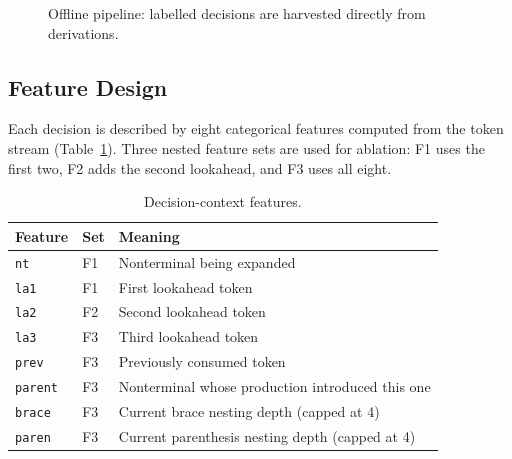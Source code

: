 \documentclass[12pt,a4paper]{article}
\begin{document}
\begin{figure}[H]
\centering
{}
\caption{Offline pipeline: labelled decisions are harvested directly from derivations.}
\label{fig:train}
\end{figure}

\subsection{Feature Design}

Each decision is described by eight categorical features computed from the
token stream (Table~\ref{tab:features}). Three nested feature sets are used for
ablation: F1 uses the first two, F2 adds the second lookahead, and F3 uses all
eight.

\begin{table}[H]
\centering
\caption{Decision-context features.}
\label{tab:features}
\small
\begin{tabularx}{\textwidth}{llX}
\toprule
\textbf{Feature} & \textbf{Set} & \textbf{Meaning}\\
\midrule
\texttt{nt}     & F1 & Nonterminal being expanded\\
\texttt{la1}    & F1 & First lookahead token\\
\texttt{la2}    & F2 & Second lookahead token\\
\texttt{la3}    & F3 & Third lookahead token\\
\texttt{prev}   & F3 & Previously consumed token\\
\texttt{parent} & F3 & Nonterminal whose production introduced this one\\
\texttt{brace}  & F3 & Current brace nesting depth (capped at 4)\\
\texttt{paren}  & F3 & Current parenthesis nesting depth (capped at 4)\\
\bottomrule
\end{tabularx}
\end{table}
\end{document}

